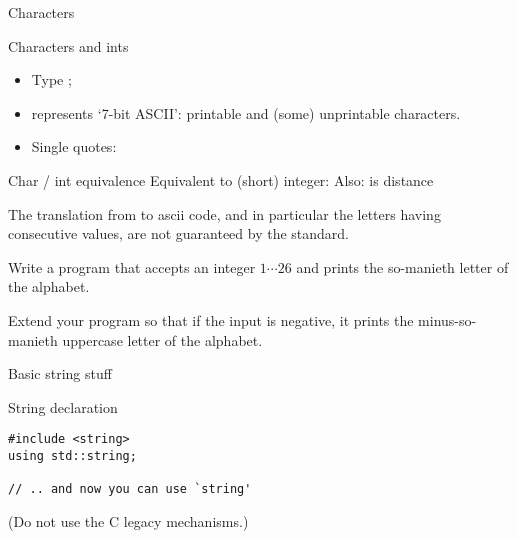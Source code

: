 
 {Characters}
\label{sec:charint}

\begin{block}{Characters and ints}
  \label{sl:chardef}
  \begin{itemize}
  \item Type ;
  \item represents `7-bit ASCII': printable and (some) unprintable
    characters.
  \item Single quotes: 
  \end{itemize}
\end{block}

\begin{block}{Char / int equivalence}
  \label{sl:int-char}
  Equivalent to (short) integer:
  Also:  is distance 
\end{block}

\begin{remark}
  The translation from  to ascii code,
  and in particular the letters having consecutive values,
  are not guaranteed by the standard.
\end{remark}

\begin{exercise}
  \label{ex:print-ichar}
  Write a program that accepts an integer $1\cdots26$ and prints the
  so-manieth letter of the alphabet.

  Extend your program so that if the input is negative, it prints the
  minus-so-manieth uppercase letter of the alphabet.
\end{exercise}

 {Basic string stuff}
\label{sec:string}

\begin{block}{String declaration}
  \label{sl:string-declare}
\begin{lstlisting}
#include <string>
using std::string;

// .. and now you can use `string'
\end{lstlisting}
(Do not use the C legacy mechanisms.)
\end{block}

